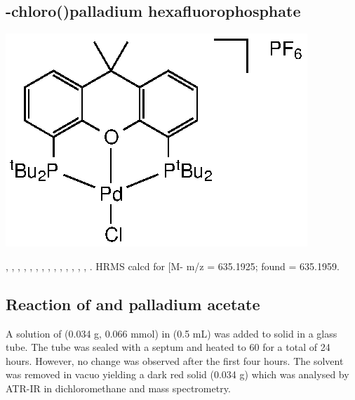 \subsection*{\trans-chloro(\tBuXantphos)palladium hexafluorophosphate}
\begin{structure}[h]
\begin{center}
\includegraphics{../Structures/CtBuPdClPF6.eps}
\end{center}
\end{structure}

,
,
,
,
,
,
,
,
,
,
,
,
,
,
.
HRMS calcd for  [M-\ce{PF6]+} m/z = 635.1925; found = 635.1959.

\subsection*{Reaction of \tBusixantphos{} and palladium acetate}

A solution of \tBusixantphos{} (0.034 g, 0.066 mmol) in  (0.5 mL) was added to solid \ce{[Pd(OAc)2]} in a glass tube.  The tube was sealed with a septum and heated to 60 \degC for a total of 24 hours.  However, no change was observed after the first four hours.  The solvent was removed in vacuo yielding a dark red solid (0.034 g) which was analysed by ATR-IR in dichloromethane and mass spectrometry.  

